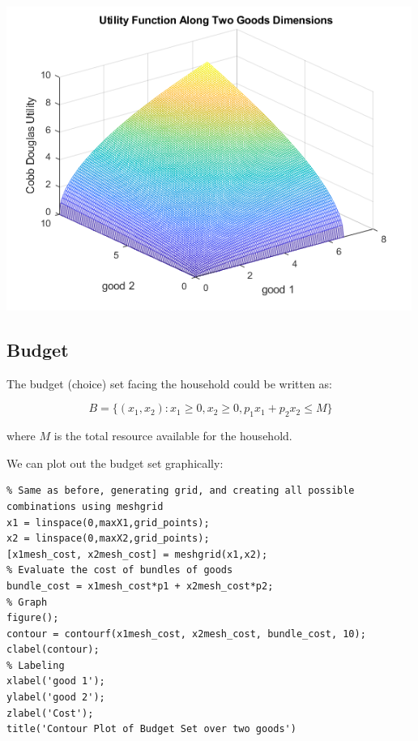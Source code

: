 \documentclass[
]{book}
\begin{document}
\includegraphics[width=5.20833in,height=\textheight]{img/twogoods_images/figure_0.png}

\hypertarget{budget}{%
\subsection{Budget}\label{budget}}

The budget (choice) set facing the household could be written as:

\[B=\lbrace (x_1 ,x_2 ):x_1 \ge 0,x_2 \ge 0,p_1 x_1 +p_2 x_2 \le M\rbrace\]

where \(M\) is the total resource available for the household.

We can plot out the budget set graphically:

\begin{verbatim}
% Same as before, generating grid, and creating all possible combinations using meshgrid
x1 = linspace(0,maxX1,grid_points);
x2 = linspace(0,maxX2,grid_points);
[x1mesh_cost, x2mesh_cost] = meshgrid(x1,x2);
% Evaluate the cost of bundles of goods
bundle_cost = x1mesh_cost*p1 + x2mesh_cost*p2;
% Graph
figure();
contour = contourf(x1mesh_cost, x2mesh_cost, bundle_cost, 10);
clabel(contour);
% Labeling
xlabel('good 1');
ylabel('good 2');
zlabel('Cost');
title('Contour Plot of Budget Set over two goods')
\end{verbatim}
\end{document}
